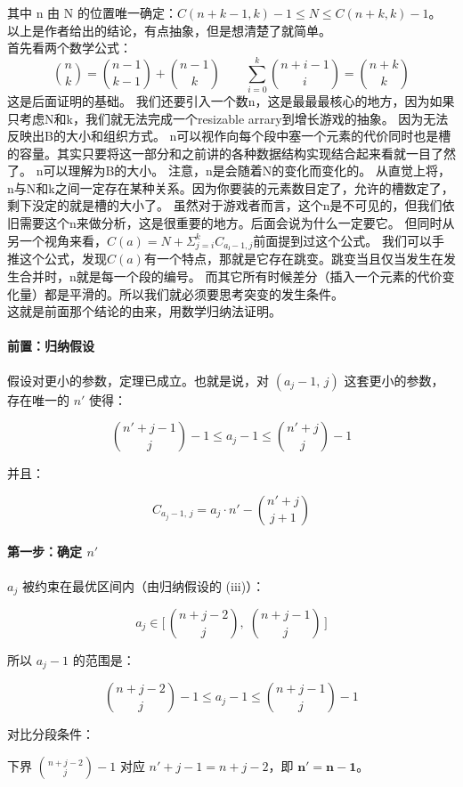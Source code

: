 \documentclass[12pt,a4paper]{article}
\begin{document}
其中 n 由 N 的位置唯一确定：$C(n+k-1,k)−1 ≤ N ≤ C(n+k,k)−1。$
以上是作者给出的结论，有点抽象，但是想清楚了就简单。\\
首先看两个数学公式：$$
\binom{n}{k} = \binom{n-1}{k-1} + \binom{n-1}{k}
\qquad
\sum_{i=0}^{k} \binom{n+i-1}{i} = \binom{n+k}{k}
$$
这是后面证明的基础。
我们还要引入一个数n，这是最最最核心的地方，因为如果只考虑N和k，我们就无法完成一个resizable arrary到增长游戏的抽象。
因为无法反映出B的大小和组织方式。
n可以视作向每个段中塞一个元素的代价同时也是槽的容量。其实只要将这一部分和之前讲的各种数据结构实现结合起来看就一目了然了。
n可以理解为B的大小。
注意，n是会随着N的变化而变化的。
从直觉上将，n与N和k之间一定存在某种关系。因为你要装的元素数目定了，允许的槽数定了，剩下没定的就是槽的大小了。
虽然对于游戏者而言，这个n是不可见的，但我们依旧需要这个n来做分析，这是很重要的地方。后面会说为什么一定要它。
但同时从另一个视角来看，$C(a) = N + Σ_{j=i}^{k} C_{aⱼ-1, j}$前面提到过这个公式。
我们可以手推这个公式，发现$C(a)$有一个特点，那就是它存在跳变。跳变当且仅当发生在发生合并时，n就是每一个段的编号。
而其它所有时候差分（插入一个元素的代价变化量）都是平滑的。所以我们就必须要思考突变的发生条件。\\
这就是前面那个结论的由来，用数学归纳法证明。\\
\paragraph{前置：归纳假设}

假设对更小的参数，定理已成立。也就是说，对 $(a_j-1,\,j)$ 这套更小的参数，存在唯一的 $n'$ 使得：

$$
\binom{n'+j-1}{j} - 1 \leq a_j-1 \leq \binom{n'+j}{j} - 1
$$

并且：

$$
C_{a_j-1,\,j} = a_j \cdot n' - \binom{n'+j}{j+1}
$$

\paragraph{第一步：确定 $n'$}

$a_j$ 被约束在最优区间内（由归纳假设的 (iii)）：

$$
a_j \in \bigl[\, \binom{n+j-2}{j},\; \binom{n+j-1}{j} \,\bigr]
$$

所以 $a_j-1$ 的范围是：

$$
\binom{n+j-2}{j} - 1 \leq a_j-1 \leq \binom{n+j-1}{j} - 1
$$

对比分段条件：

下界 $\binom{n+j-2}{j}-1$ 对应 $n'+j-1 = n+j-2$，即 $\mathbf{n' = n-1}$。
\end{document}
